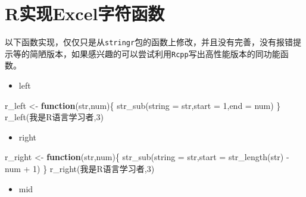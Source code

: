 \documentclass[
]{book}
\newenvironment{Shaded}{\begin{snugshade}}{\end{snugshade}}
\newcommand{\AttributeTok}[1]{\textcolor[rgb]{0.77,0.63,0.00}{#1}}
\newcommand{\ControlFlowTok}[1]{\textcolor[rgb]{0.13,0.29,0.53}{\textbf{#1}}}
\newcommand{\DecValTok}[1]{\textcolor[rgb]{0.00,0.00,0.81}{#1}}
\newcommand{\FunctionTok}[1]{\textcolor[rgb]{0.00,0.00,0.00}{#1}}
\newcommand{\NormalTok}[1]{#1}
\newcommand{\OtherTok}[1]{\textcolor[rgb]{0.56,0.35,0.01}{#1}}
\newcommand{\SpecialCharTok}[1]{\textcolor[rgb]{0.00,0.00,0.00}{#1}}
\newcommand{\StringTok}[1]{\textcolor[rgb]{0.31,0.60,0.02}{#1}}
\providecommand{\tightlist}{%
  \setlength{\itemsep}{0pt}\setlength{\parskip}{0pt}}
\begin{document}
\hypertarget{rux5b9eux73b0excelux5b57ux7b26ux51fdux6570}{%
\section{R实现Excel字符函数}\label{rux5b9eux73b0excelux5b57ux7b26ux51fdux6570}}

以下函数实现，仅仅只是从\texttt{stringr}包的函数上修改，并且没有完善，没有报错提示等的简陋版本，如果感兴趣的可以尝试利用\texttt{Rcpp}写出高性能版本的同功能函数。

\begin{itemize}
\tightlist
\item
  left
\end{itemize}

\begin{Shaded}
\begin{Highlighting}[]
\NormalTok{r\_left }\OtherTok{\textless{}{-}} \ControlFlowTok{function}\NormalTok{(str,num)\{}
  \FunctionTok{str\_sub}\NormalTok{(}\AttributeTok{string =}\NormalTok{ str,}\AttributeTok{start =} \DecValTok{1}\NormalTok{,}\AttributeTok{end =}\NormalTok{ num)}
\NormalTok{\}}
\FunctionTok{r\_left}\NormalTok{(}\StringTok{\textquotesingle{}我是R语言学习者\textquotesingle{}}\NormalTok{,}\DecValTok{3}\NormalTok{)}
\end{Highlighting}
\end{Shaded}

\begin{itemize}
\tightlist
\item
  right
\end{itemize}

\begin{Shaded}
\begin{Highlighting}[]
\NormalTok{r\_right }\OtherTok{\textless{}{-}} \ControlFlowTok{function}\NormalTok{(str,num)\{}
  \FunctionTok{str\_sub}\NormalTok{(}\AttributeTok{string =}\NormalTok{ str,}\AttributeTok{start =} \FunctionTok{str\_length}\NormalTok{(str) }\SpecialCharTok{{-}}\NormalTok{ num }\SpecialCharTok{+} \DecValTok{1}\NormalTok{)}
\NormalTok{\}}
\FunctionTok{r\_right}\NormalTok{(}\StringTok{\textquotesingle{}我是R语言学习者\textquotesingle{}}\NormalTok{,}\DecValTok{3}\NormalTok{)}
\end{Highlighting}
\end{Shaded}

\begin{itemize}
\tightlist
\item
  mid
\end{itemize}
\end{document}
